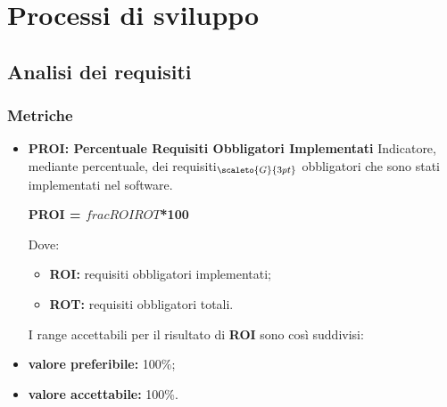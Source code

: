 \section{Processi di sviluppo}\label{QualitàDelProcessoProcessiDiSviluppo}
\subsection{Analisi dei requisiti}\label{ProcessiDiSviluppoAnalisiDeiRequisiti}
\subsubsection{Metriche}\label{MetricheProcessiDiSviluppo}
\begin{itemize}
	\item[] \textbf{PROI: Percentuale Requisiti Obbligatori Implementati}
	Indicatore, mediante percentuale, dei requisiti$_{\scaleto{G}{3pt}}$ obbligatori che sono stati implementati nel software.
	\begin{center}
		\textbf{PROI = $frac{ROI}{ROT}$*100}
	\end{center}
	Dove:
	\begin{itemize}
		\item \textbf{ROI:} requisiti obbligatori implementati;
		\item \textbf{ROT:} requisiti obbligatori totali.
	\end{itemize}
	I range accettabili per il risultato di \textbf{ROI} sono così suddivisi:
	\item \textbf{valore preferibile:} 100\%;
	\item \textbf{valore accettabile:} 100\%.
\end{itemize}

